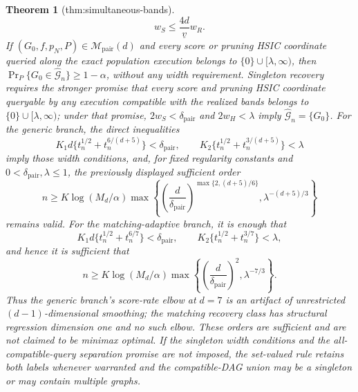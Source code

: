 \documentclass{article}
\newtheorem{theorem}{Theorem}
\begin{document}
\begin{theorem}[thm:simultaneous-bands]
\[
 w_S\le \frac{4d}{\underline v}w_R.
\]
If \((G_0,f,p_N,P)\in\mathcal M_{\mathrm{pair}}(d)\) and every score or pruning HSIC coordinate queried along the exact population execution belongs to \(\{0\}\cup[\lambda,\infty)\), then \(\Pr_P\{G_0\in\widehat{\mathcal G}_n\}\ge1-\alpha\), without any width requirement. Singleton recovery requires the stronger promise that every score and pruning HSIC coordinate queryable by any execution compatible with the realized bands belongs to \(\{0\}\cup[\lambda,\infty)\); under that promise, \(2w_S<\delta_{\mathrm{pair}}\) and \(2w_H<\lambda\) imply \(\widehat{\mathcal G}_n=\{G_0\}\). For the generic branch, the direct inequalities
\[
 K_1d\{t_n^{1/2}+t_n^{6/(d+5)}\}<\delta_{\mathrm{pair}},
 \qquad
 K_2\{t_n^{1/2}+t_n^{3/(d+5)}\}<\lambda
\]
imply those width conditions, and, for fixed regularity constants and \(0<\delta_{\mathrm{pair}},\lambda\le1\), the previously displayed sufficient order
\[
 n\ge K\log(M_d/\alpha)
 \max\left\{
 \left(\frac d{\delta_{\mathrm{pair}}}\right)^{\max\{2,(d+5)/6\}},
 \lambda^{-(d+5)/3}
 \right\}
\]
remains valid. For the matching-adaptive branch, it is enough that
\[
 K_1d\{t_n^{1/2}+t_n^{6/7}\}<\delta_{\mathrm{pair}},
 \qquad
 K_2\{t_n^{1/2}+t_n^{3/7}\}<\lambda,
\]
and hence it is sufficient that
\[
 n\ge K\log(M_d/\alpha)
 \max\left\{
 \left(\frac d{\delta_{\mathrm{pair}}}\right)^2,
 \lambda^{-7/3}
 \right\}.
\]
Thus the generic branch's score-rate elbow at \(d=7\) is an artifact of unrestricted \((d-1)\)-dimensional smoothing; the matching recovery class has structural regression dimension one and no such elbow. These orders are sufficient and are not claimed to be minimax optimal. If the singleton width conditions and the all-compatible-query separation promise are not imposed, the set-valued rule retains both labels whenever warranted and the compatible-DAG union may be a singleton or may contain multiple graphs.
\end{theorem}
\end{document}
